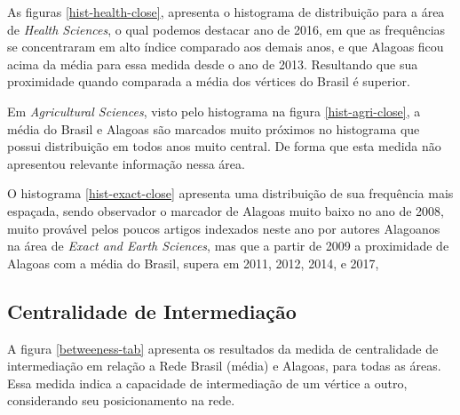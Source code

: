 As figuras \ref{hist-health-close}, apresenta o histograma de distribuição para a área de \textit{Health Sciences}, o qual podemos destacar ano de 2016, em que as frequências se concentraram em alto índice comparado aos demais anos, e que Alagoas ficou acima da média para essa medida desde o ano de 2013. Resultando que sua proximidade quando comparada a média dos vértices do Brasil é superior.

Em \textit{Agricultural Sciences}, visto pelo histograma na figura \ref{hist-agri-close}, a média do Brasil e Alagoas são marcados muito próximos no histograma que possui distribuição em todos anos muito central. De forma que esta medida não apresentou relevante informação nessa área.

O histograma \ref{hist-exact-close} apresenta uma distribuição de sua frequência mais espaçada, sendo observador o marcador de Alagoas muito baixo no ano de 2008, muito provável pelos poucos artigos indexados neste ano por autores Alagoanos na área de \textit{Exact and Earth Sciences}, mas que a partir de 2009 a proximidade de Alagoas com a média do Brasil, supera em 2011, 2012, 2014, e 2017,



\subsection{\textbf{Centralidade de Intermediação}}

A figura \ref{betweeness-tab} apresenta os resultados da medida de centralidade de intermediação em relação a Rede Brasil (média) e Alagoas, para todas as áreas. Essa medida indica a capacidade de intermediação de um vértice a outro, considerando seu posicionamento na rede.

